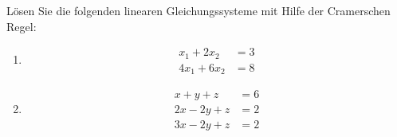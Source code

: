 \begin{ExerciseBlock}
Lösen Sie die folgenden linearen Gleichungssysteme mit Hilfe der Cramerschen Regel:
\begin{enumerate}[label=\alph*)]
	\item 
	\begin{equation*}
	\begin{split}
		x_1 + 2x_2 &= 3 \\
 		4x_1 + 6x_2 &= 8
	\end{split}
	\end{equation*}

	\item 
	\begin{equation*}
	\begin{split}
		x  + y + z &= 6 \\
 		2x -2y + z &= 2 \\
 		3x -2y + z &= 2
	\end{split}
	\end{equation*}

\end{enumerate}

\end{ExerciseBlock}
